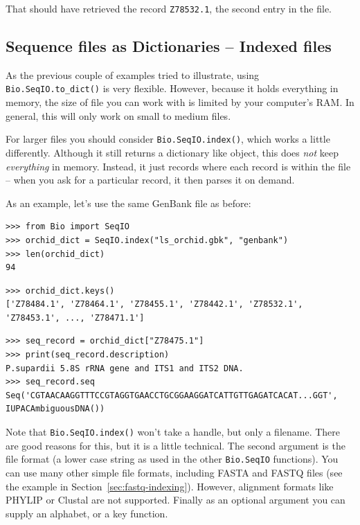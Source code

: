\documentclass{report}
\begin{document}
\noindent That should have retrieved the record {\tt Z78532.1}, the second entry in the file.

\subsection{Sequence files as Dictionaries -- Indexed files}
\label{sec:SeqIO-index}

As the previous couple of examples tried to illustrate, using
\verb|Bio.SeqIO.to_dict()| is very flexible. However, because it holds
everything in memory, the size of file you can work with is limited by your
computer's RAM. In general, this will only work on small to medium files.

For larger files you should consider
\verb|Bio.SeqIO.index()|, which works a little differently. Although
it still returns a dictionary like object, this does \emph{not} keep
\emph{everything} in memory. Instead, it just records where each record
is within the file -- when you ask for a particular record, it then parses
it on demand.

As an example, let's use the same GenBank file as before:

\begin{verbatim}
>>> from Bio import SeqIO
>>> orchid_dict = SeqIO.index("ls_orchid.gbk", "genbank")
>>> len(orchid_dict)
94
\end{verbatim}
\begin{verbatim}
>>> orchid_dict.keys()
['Z78484.1', 'Z78464.1', 'Z78455.1', 'Z78442.1', 'Z78532.1', 'Z78453.1', ..., 'Z78471.1']
\end{verbatim}
\begin{verbatim}
>>> seq_record = orchid_dict["Z78475.1"]
>>> print(seq_record.description)
P.supardii 5.8S rRNA gene and ITS1 and ITS2 DNA.
>>> seq_record.seq
Seq('CGTAACAAGGTTTCCGTAGGTGAACCTGCGGAAGGATCATTGTTGAGATCACAT...GGT', IUPACAmbiguousDNA())
\end{verbatim}

\noindent Note that \verb|Bio.SeqIO.index()| won't take a handle,
but only a filename. There are good reasons for this, but it is a little
technical. The second argument is the file format (a lower case string as
used in the other \verb|Bio.SeqIO| functions). You can use many other
simple file formats, including FASTA and FASTQ files (see the example in
Section~\ref{sec:fastq-indexing}). However, alignment
formats like PHYLIP or Clustal are not supported. Finally as an optional
argument you can supply an alphabet, or a key function.
\end{document}
